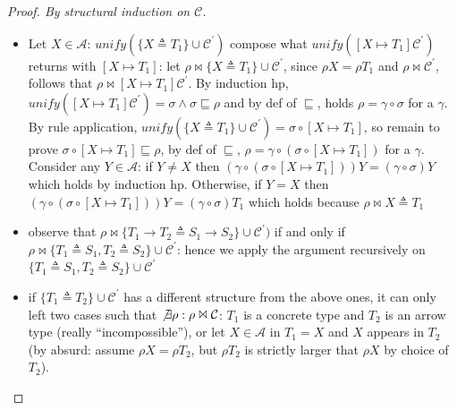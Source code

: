 \documentclass[8pt]{beamer}
\begin{document}
\begin{frame}
\begin{proof}[Proof. By structural induction on $\mathcal{C}$]
\begin{itemize}
            \item Let $X \in \mathcal{A}$: $unify(\{X \triangleq T_1\}
            \cup \mathcal{C}^{\prime})$
            compose what $unify([ X \mapsto T_1]\mathcal{C}^{\prime})$ 
            returns with $[X \mapsto T_1]$: let $\rho \Join
                \{X \triangleq T_1\} \cup 
                \mathcal{C}^{\prime}$, since $\rho X = \rho T_1$ 
                and $\rho \Join \mathcal{C}^{\prime}$, follows that
                $\rho \Join [X \mapsto T_1]\mathcal{C}^{\prime}$. 
                By induction hp, 
            $unify([ X \mapsto T_1]\mathcal{C}^{\prime}) = \sigma
            \wedge \sigma \sqsubseteq \rho$ and by def of 
            $\sqsubseteq$, holds $\rho = \gamma \circ \sigma$ for a
            $\gamma$. By rule application, $unify(\{X \triangleq T_1\}
            \cup \mathcal{C}^{\prime}) = \sigma \circ [X\mapsto T_1]$,
            so remain to prove $\sigma \circ [X\mapsto T_1] 
            \sqsubseteq \rho$, by def of 
            $\sqsubseteq$, $\rho = \gamma \circ (\sigma \circ
            [X\mapsto T_1])$ for a $\gamma$.
            Consider any $Y\in \mathcal{A}$: if $Y\not = X$ then 
            $(\gamma \circ (\sigma \circ [X\mapsto T_1]))Y = 
            (\gamma \circ \sigma) Y$ which holds by induction hp.
            Otherwise, if $Y=X$ then $(\gamma \circ (\sigma 
            \circ [X\mapsto T_1]))Y = (\gamma \circ \sigma)T_1$
            which holds because $\rho \Join {X\triangleq T_1}$
            \item observe that $\rho \Join \{T_1 \rightarrow T_2 
                \triangleq S_1\rightarrow S_2 \} \cup 
                \mathcal{C}^{\prime})$ if and only if 
                $\rho \Join \{T_1 \triangleq S_1,
                    T_2 \triangleq S_2\}\cup\mathcal{C}^{\prime}$:
                    hence we apply the argument recursively on 
                    $\{T_1 \triangleq S_1,
                    T_2 \triangleq S_2\}\cup\mathcal{C}^{\prime}$
                    
                    \item if $\{T_1 \triangleq T_2\} \cup \mathcal{C}
                        ^{\prime}$ has a different structure 
                        from the above ones, it can only left two cases
                        such that $\not \exists \rho: \rho \Join \mathcal{C}$: 
                        $T_1$ is a concrete type and $T_2$ is an arrow 
                        type (really ``incompossible''), or let $X\in\mathcal{A}$
                        in $T_1=X$ and $X$ appears in $T_2$ (by absurd:  
                        assume $\rho X = \rho T_2$, but $\rho T_2$ is strictly
                        larger that $\rho X$ by choice of $T_2$).
        \end{itemize}
    \end{proof}
    \normalsize
\end{frame}
\end{document}
